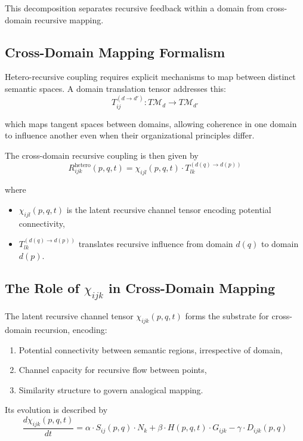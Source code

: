 This decomposition separates recursive feedback within a domain from cross-domain recursive mapping.

\subsection{Cross-Domain Mapping Formalism}

Hetero-recursive coupling requires explicit mechanisms to map between distinct semantic spaces. A domain translation tensor addresses this:
\begin{equation}
T_{ij}^{(d \to d')} : T\mathcal{M}_d \to T\mathcal{M}_{d'}
\end{equation}

which maps tangent spaces between domains, allowing coherence in one domain to influence another even when their organizational principles differ.

The cross-domain recursive coupling is then given by
\begin{equation}
R_{ijk}^{\text{hetero}}(p, q, t) = \chi_{ijl}(p, q, t) \cdot T_{lk}^{(d(q) \to d(p))}
\end{equation}

where
\begin{itemize}
    \item \(\chi_{ijl}(p, q, t)\) is the latent recursive channel tensor encoding potential connectivity,
    \item \(T_{lk}^{(d(q) \to d(p))}\) translates recursive influence from domain \(d(q)\) to domain \(d(p)\).
\end{itemize}

\subsection{\texorpdfstring{The Role of $\chi_{ijk}$ in Cross-Domain Mapping}{The Role of chi_ijk in Cross-Domain Mapping}}

The latent recursive channel tensor \(\chi_{ijk}(p, q, t)\) forms the substrate for cross-domain recursion, encoding:
\begin{enumerate}
    \item Potential connectivity between semantic regions, irrespective of domain,
    \item Channel capacity for recursive flow between points,
    \item Similarity structure to govern analogical mapping.
\end{enumerate}

Its evolution is described by
\begin{equation}
\frac{d\chi_{ijk}(p, q, t)}{dt} = \alpha \cdot S_{ij}(p, q) \cdot N_k + \beta \cdot H(p, q, t) \cdot G_{ijk} - \gamma \cdot D_{ijk}(p, q)
\end{equation}


